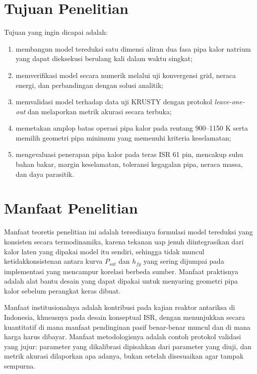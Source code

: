 \documentclass[
  indonesian,
  12pt,
  a4paper,
]{report}
\providecommand{\tightlist}{%
  \setlength{\itemsep}{0pt}\setlength{\parskip}{0pt}}
\begin{document}
\section{Tujuan Penelitian}\label{tujuan-penelitian}

Tujuan yang ingin dicapai adalah:

\begin{enumerate}
\def\labelenumi{\arabic{enumi}.}
\tightlist
\item
  membangun model tereduksi satu dimensi aliran dua fasa pipa kalor
  natrium yang dapat dieksekusi berulang kali dalam waktu singkat;
\item
  memverifikasi model secara numerik melalui uji konvergensi grid,
  neraca energi, dan perbandingan dengan solusi analitik;
\item
  memvalidasi model terhadap data uji KRUSTY dengan protokol
  \emph{leave-one-out} dan melaporkan metrik akurasi secara terbuka;
\item
  memetakan amplop batas operasi pipa kalor pada rentang 900--1150 K
  serta memilih geometri pipa minimum yang memenuhi kriteria
  keselamatan;
\item
  mengevaluasi penerapan pipa kalor pada teras ISR 61 pin, mencakup suhu
  bahan bakar, margin keselamatan, toleransi kegagalan pipa, neraca
  massa, dan daya parasitik.
\end{enumerate}

\section{Manfaat Penelitian}\label{manfaat-penelitian}

Manfaat teoretis penelitian ini adalah tersedianya formulasi model
tereduksi yang konsisten secara termodinamika, karena tekanan uap jenuh
diintegrasikan dari kalor laten yang dipakai model itu sendiri, sehingga
tidak muncul ketidakkonsistenan antara kurva \(P_{sat}\) dan \(h_{fg}\)
yang sering dijumpai pada implementasi yang mencampur korelasi berbeda
sumber. Manfaat praktisnya adalah alat bantu desain yang dapat dipakai
untuk menyaring geometri pipa kalor sebelum perangkat keras dibuat.

Manfaat institusionalnya adalah kontribusi pada kajian reaktor antariksa
di Indonesia, khususnya pada desain konseptual ISR, dengan menunjukkan
secara kuantitatif di mana manfaat pendinginan pasif benar-benar muncul
dan di mana harga harus dibayar. Manfaat metodologisnya adalah contoh
protokol validasi yang jujur: parameter yang dikalibrasi dipisahkan dari
parameter yang diuji, dan metrik akurasi dilaporkan apa adanya, bukan
setelah disesuaikan agar tampak sempurna.
\end{document}
